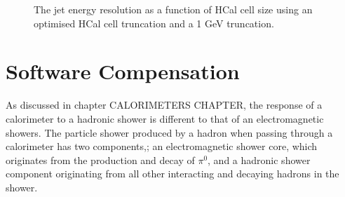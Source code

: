 \begin{figure}
\caption[The jet energy resolution as a function of HCal cell size using \protect{} an optimised HCal cell truncation and \protect{} a fixed 1 GeV truncation.]{The jet energy resolution as a function of HCal cell size using \protect{} an optimised HCal cell truncation and \protect{} a 1 GeV truncation.}
\label{fig:jerhcalcellopt}
\end{figure}


\section{Software Compensation}
\label{sec:softcomp}
As discussed in chapter CALORIMETERS CHAPTER, the response of a calorimeter to a hadronic shower is different to that of an electromagnetic showers.  The particle shower produced by a hadron when passing through a calorimeter has two components,\cite{Wigmans:2000vf}; an electromagnetic shower core, which originates from the production and decay of $\pi^{0}$, and a hadronic shower component originating from all other interacting and decaying hadrons in the shower.  

